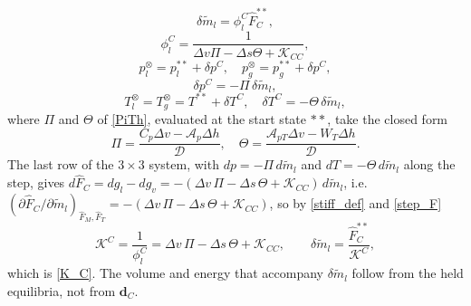 \begin{equation}\label{dm_C}
\delta\tilde{m}_l = \phi_l^C \hat{F}_C^{**},
\end{equation}
\begin{equation}
\phi_l^C = \frac{1}{\Delta v \Pi - \Delta s \Theta + \mathcal{K}_{CC}},
\end{equation}
\begin{equation}
p_l^{\otimes} = p_l^{**} + \delta p^C, \quad p_g^{\otimes} = p_g^{**} + \delta p^C,
\end{equation}
\begin{equation}
\delta p^C = -\Pi\, \delta\tilde{m}_l,
\end{equation}
\begin{equation}
T_l^{\otimes} = T_g^{\otimes} = T^{**} + \delta T^C, \quad \delta T^C = -\Theta\, \delta\tilde{m}_l,
\end{equation}
where $\Pi$ and $\Theta$ of \eqref{PiTh}, evaluated at the start state $**$, take the closed form
\begin{equation}
\Pi = \frac{C_p \Delta v - \mathcal{A}_p \Delta h}{\mathcal{D}}, \quad \Theta = \frac{\mathcal{A}_{pT} \Delta v - W_T \Delta h}{\mathcal{D}}.
\end{equation}
The last row of the $3\times3$ system, with $dp=-\Pi\,d\tilde{m}_l$ and $dT=-\Theta\,d\tilde{m}_l$ along the step, gives $d\hat{F}_C=dg_l-dg_v=-(\Delta v\,\Pi-\Delta s\,\Theta+\mathcal{K}_{CC})\,d\tilde{m}_l$, i.e.\ $(\partial \hat{F}_C/\partial\tilde{m}_l)_{\hat{F}_M,\hat{F}_T}=-(\Delta v\,\Pi-\Delta s\,\Theta+\mathcal{K}_{CC})$, so by \eqref{stiff_def} and \eqref{step_F}
\begin{equation}\label{K_C_phase}
\mathcal{K}^C=\frac1{\phi_l^C}=\Delta v\,\Pi-\Delta s\,\Theta+\mathcal{K}_{CC},\qquad \delta\tilde{m}_l=\frac{\hat{F}_C^{**}}{\mathcal{K}^C},
\end{equation}
which is \eqref{K_C}. The volume and energy that accompany $\delta\tilde{m}_l$ follow from the held equilibria, not from $\boldsymbol{d}_C$.


